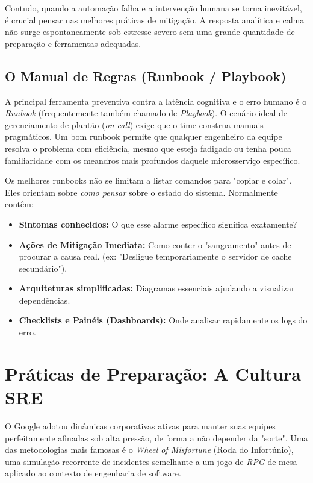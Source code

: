 \documentclass[12pt,a4paper]{report}
\begin{document}
Contudo, quando a automação falha e a intervenção humana se torna inevitável, é crucial pensar nas melhores práticas de mitigação. A resposta analítica e calma não surge espontaneamente sob estresse severo sem uma grande quantidade de preparação e ferramentas adequadas.

\subsection{O Manual de Regras (Runbook / Playbook)}

A principal ferramenta preventiva contra a latência cognitiva e o erro humano é o \textit{Runbook} (frequentemente também chamado de \textit{Playbook}). O cenário ideal de gerenciamento de plantão (\textit{on-call}) exige que o time construa manuais pragmáticos. Um bom runbook permite que qualquer engenheiro da equipe resolva o problema com eficiência, mesmo que esteja fadigado ou tenha pouca familiaridade com os meandros mais profundos daquele microsserviço específico.

Os melhores runbooks não se limitam a listar comandos para "copiar e colar". Eles orientam sobre \textit{como pensar} sobre o estado do sistema. Normalmente contêm:
\begin{itemize}
    \item \textbf{Sintomas conhecidos:} O que esse alarme específico significa exatamente?
    \item \textbf{Ações de Mitigação Imediata:} Como conter o "sangramento" antes de procurar a causa real. (ex: "Desligue temporariamente o servidor de cache secundário").
    \item \textbf{Arquiteturas simplificadas:} Diagramas essenciais ajudando a visualizar dependências.
    \item \textbf{Checklists e Painéis (Dashboards):} Onde analisar rapidamente os logs do erro.
\end{itemize}

\section{Práticas de Preparação: A Cultura SRE}

O Google adotou dinâmicas corporativas ativas para manter suas equipes perfeitamente afinadas sob alta pressão, de forma a não depender da "sorte". Uma das metodologias mais famosas é o \textit{Wheel of Misfortune} (Roda do Infortúnio), uma simulação recorrente de incidentes semelhante a um jogo de \textit{RPG} de mesa aplicado ao contexto de engenharia de software.
\end{document}
